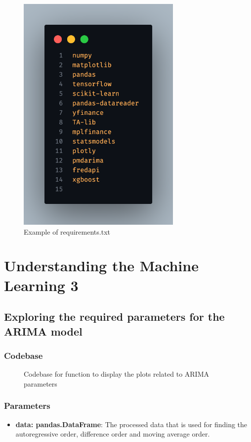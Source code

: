 \documentclass[11pt]{article}
\begin{document}
\begin{figure}[ht]
    \centering
    \includegraphics[width=8cm]{./images/requirements.png}
    \caption{Example of requirements.txt}
    \label{fig:requirements}
\end{figure}

\section{Understanding the Machine Learning 3}
\subsection{Exploring the required parameters for the ARIMA model}

\subsubsection{Codebase}

\begin{figure}[ht]
    \centering
    \caption{Codebase for function to display the plots related to ARIMA parameters}
    \label{fig:arima_params_code}
\end{figure}

\subsubsection{Parameters}
\begin{itemize}
    \item \textbf{data: pandas.DataFrame}: The processed data that is used for finding the autoregressive order, difference order and moving average order.
\end{itemize}
\end{document}

